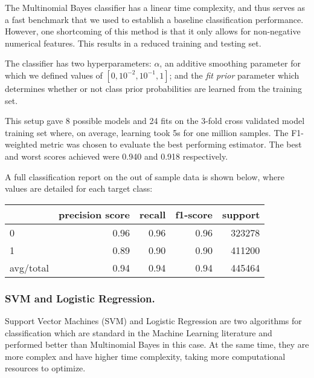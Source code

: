 The Multinomial Bayes classifier has a linear time complexity, and thus serves as a fast benchmark that we used to establish a baseline classification performance. However, one shortcoming of this method is that it only allows for non-negative numerical features. This results in a reduced training and testing set.

The classifier has two hyperparameters: $\alpha$, an additive smoothing parameter for which we defined values of $[0,{10^{-2}},{10^{-1}},1]$; and the \textit{fit prior} parameter which determines whether or not class prior probabilities are learned from the training set. 

This setup gave 8 possible models and 24 fits on the 3-fold cross validated model training set where, on average, learning took 5s for one million samples. The F1-weighted metric was chosen to evaluate the best performing estimator.
The best and worst scores achieved were 0.940 and 0.918 respectively. 

A full classification report on the out of sample data is shown below, where values are detailed for each target class:
\begin{table}[ht]
	\label{tab:classification_report}
	\centering
	\begin{tabular}{ l r r r r }
		\toprule
		{ } & precision score & recall & f1-score & support \\
		\midrule
		0 		 & 0.96 & 0.96 & 0.96 & 323278 \\
		1		 & 0.89 & 0.90 & 0.90 & 411200 \\
		avg/total & 0.94 & 0.94 & 0.94 & 445464 \\
		\bottomrule
	\end{tabular}
\end{table}


\subsubsection{SVM and Logistic Regression.}

Support Vector Machines (SVM) and Logistic Regression are two algorithms for classification which are standard in the Machine Learning literature and performed better than Multinomial Bayes in this case. 
At the same time, they are more complex and have higher time complexity, taking more computational resources to optimize.

